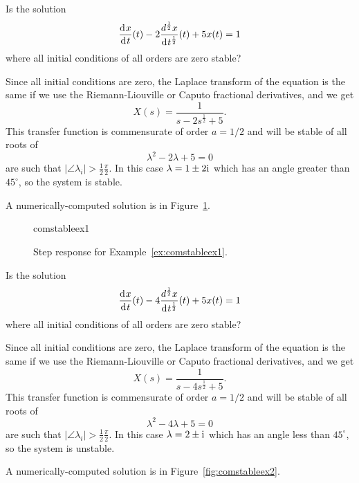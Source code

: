 

\begin{example}
  Is the solution
  \begin{equation*}
  	\frac{\operatorname{d}\hspace*{-1pt} x}{\operatorname{d}\hspace*{-1pt} t}(t) -2  \frac{d^\frac{1}{2} x}{\operatorname{d}\hspace*{-1pt} t^\frac{1}{2}}(t) + 5 x(t) = 1
  \end{equation*}
  where all initial conditions of all orders are zero stable?

  Since all initial conditions are zero, the Laplace transform of the equation is the same if we use the Riemann-Liouville or Caputo fractional derivatives, and we get
  \begin{equation*}
    X(s) = \frac{1}{s - 2 s^\frac{1}{2} + 5}.
  \end{equation*}
  This transfer function is commensurate of order $a = 1/2$ and will be stable of all roots of
  \begin{equation*}
    \lambda^2 - 2 \lambda + 5 = 0
  \end{equation*}
   are such that $\left| \angle \lambda_i \right| > \frac{1}{2} \frac{\pi}{2}$.  In this case $\lambda = 1 \pm 2 \mathrm{i}\mkern1mu$ which has an angle greater than $45^\circ$, so the system is stable. 

	A numerically-computed solution is in Figure~\ref{fig:comstableex1}.
	\label{ex:comstableex1}
\end{example}

\begin{figure}
  \centering
  {comstableex1}
  \caption{Step response for Example~\ref{ex:comstableex1}.}
  \label{fig:comstableex1}
\end{figure}

\begin{example}
  Is the solution
  \begin{equation*}
  	\frac{\operatorname{d}\hspace*{-1pt} x}{\operatorname{d}\hspace*{-1pt} t}(t) -4  \frac{d^\frac{1}{2} x}{\operatorname{d}\hspace*{-1pt} t^\frac{1}{2}}(t) + 5 x(t) = 1
  \end{equation*}
  where all initial conditions of all orders are zero stable?

  Since all initial conditions are zero, the Laplace transform of the equation is the same if we use the Riemann-Liouville or Caputo fractional derivatives, and we get
  \begin{equation*}
    X(s) = \frac{1}{s - 4 s^\frac{1}{2} + 5}.
  \end{equation*}
  This transfer function is commensurate of order $a = 1/2$ and will be stable of all roots of
  \begin{equation*}
    \lambda^2 - 4 \lambda + 5 = 0
  \end{equation*}
   are such that $\left| \angle \lambda_i \right| > \frac{1}{2} \frac{\pi}{2}$.  In this case $\lambda = 2 \pm  \mathrm{i}\mkern1mu$ which has an angle less than $45^\circ$, so the system is unstable. 

	A numerically-computed solution is in Figure~\ref{fig:comstableex2}.
	\label{ex:comstableex2}
\end{example}

